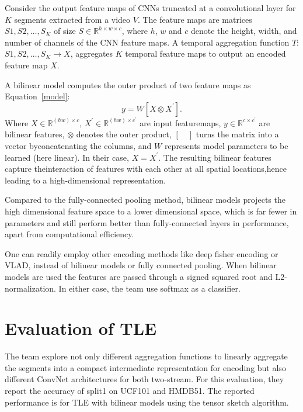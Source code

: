 \documentclass[10pt,twocolumn,letterpaper]{article}
\begin{document}
Consider the output feature maps of CNNs truncated at a convolutional layer for $K$ segments extracted from a video $V$. The feature maps are matrices ${S1, S2,\dots, S_K}$ of size $S\in \mathbb{R}^{h\times w\times c}$, where $h$, $w$ and $c$ denote the height, width, and number of channels of the CNN feature maps. A temporal aggregation function $T$: $S1, S2,\dots, S_K\rightarrow X$, aggregates $K$ temporal feature maps to output an encoded feature map $X$.

A bilinear model computes the outer product of two feature maps as Equation~\ref{model}:
\begin{equation}
y=W[X\otimes X^\prime].  \label{model} 
\end{equation}
Where $X\in \mathbb{R}^{(hw)\times c}$, $X^\prime \in \mathbb{R}^{(hw)\times c^\prime}$ are input featuremaps, $y\in \mathbb{R}^{c\times c^\prime}$ are bilinear features, $\otimes$ denotes the outer product, $[\quad]$ turns the matrix into a vector byconcatenating the columns, and $W$ represents model parameters to be learned (here linear). In their case, $X=X^\prime$. The resulting bilinear features capture theinteraction of features with each other at all spatial locations,hence leading to a high-dimensional representation.

Compared to the fully-connected pooling method, bilinear models projects the high dimensional feature space to a lower dimensional space, which is far fewer in parameters and still perform better than fully-connected layers in performance, apart from computational efficiency.

One can readily employ other encoding methods like deep fisher encoding or VLAD, instead of bilinear models or fully connected pooling. When bilinear models are used the features are passed through a signed squared root and L2-normalization. In either case, the team use softmax as a classifier.

\section{Evaluation of TLE}

The team explore not only different aggregation functions to linearly aggregate the segments into a compact intermediate representation for encoding but also different ConvNet architectures for both two-stream. For this evaluation, they report the accuracy of split1 on UCF101 and HMDB51. The reported performance is for TLE with bilinear models using the tensor sketch algorithm.
\end{document}
